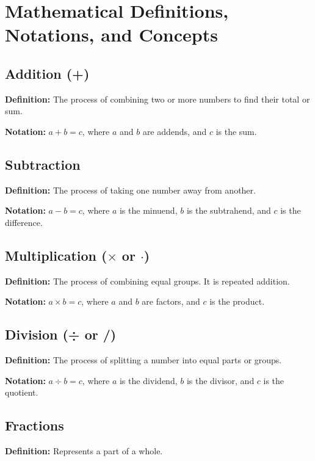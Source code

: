 \chapter{Mathematical Definitions, Notations, and Concepts}

\section{Addition (+)}

\textbf{Definition:} The process of combining two or more numbers to find their total or sum.

\textbf{Notation:} \( a + b = c \), where \( a \) and \( b \) are addends, and \( c \) is the sum.

\section{Subtraction \textendash}

\textbf{Definition:} The process of taking one number away from another.

\textbf{Notation:} \( a - b = c \), where \( a \) is the minuend, \( b \) is the subtrahend, and \( c \) is the difference.

\section{Multiplication (\( \times \) or \( \cdot \))}

\textbf{Definition:} The process of combining equal groups. It is repeated addition.

\textbf{Notation:} \( a \times b = c \), where \( a \) and \( b \) are factors, and \( c \) is the product.

\section{Division (÷ or /)}

\textbf{Definition:} The process of splitting a number into equal parts or groups.

\textbf{Notation:} \( a \div b = c \), where \( a \) is the dividend, \( b \) is the divisor, and \( c \) is the quotient.

\section{Fractions}

\textbf{Definition:} Represents a part of a whole.

